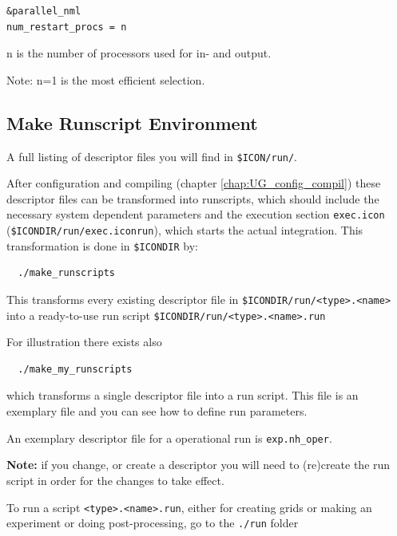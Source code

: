\begin{verbatim}
&parallel_nml
num_restart_procs = n
\end{verbatim} 

n is the number of processors used for in- and output. 

Note: n=1 is the most efficient selection.


\subsection{Make Runscript Environment}\label{sec:make_runscript}


A full listing of descriptor files you will find in \verb+$ICON/run/+. 

After configuration and compiling (chapter \ref{chap:UG_config_compil}) these descriptor files can be transformed into runscripts, which should include the necessary system dependent parameters and the execution section \verb+exec.icon+ (\verb+$ICONDIR/run/exec.iconrun+), which starts the actual integration. This transformation is done in \verb+$ICONDIR+ by:

\begin{small}
 \begin{verbatim}
  ./make_runscripts
 \end{verbatim}
\end{small}

This transforms every existing descriptor file in \verb+$ICONDIR/run/<type>.<name>+ into a ready-to-use run script \verb+$ICONDIR/run/<type>.<name>.run+

For illustration there exists also 

\begin{small}
 \begin{verbatim}
  ./make_my_runscripts
 \end{verbatim}
\end{small}

which transforms a single descriptor file into a run script. This file is an exemplary file and you can see how to define run parameters.

An exemplary descriptor file for a operational run is \verb+exp.nh_oper+.

\textbf{Note:} if you change, or create a descriptor you will need to (re)create the run script in order for the changes to take effect.

To run a script \verb+<type>.<name>.run+, either for creating grids or making an experiment or doing post-processing, go to the \verb+./run+ folder

